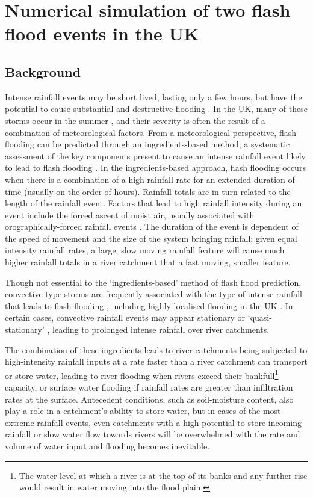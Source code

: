 \chapter{Numerical simulation of two flash flood events in the UK}
\label{chapter_events}

\section{Background}
Intense rainfall events may be short lived, lasting only a few hours, but have the potential to cause substantial and destructive flooding \citep{lane2008climate,pitt2008pitt}. In the UK, many of these storms occur in the summer \citep{Kendon2014}, and their severity is often the result of a combination of meteorological factors. From a meteorological perspective, flash flooding can be predicted through an ingredients-based method; a systematic assessment of the key components present to cause an intense rainfall event likely to lead to flash flooding \citep{Doswell1996}. In the ingredients-based approach, flash flooding occurs when there is a combination of a high rainfall rate for an extended duration of time (usually on the order of hours). Rainfall totals are in turn related to the length of the rainfall event. Factors that lead to high rainfall intensity during an event include the forced ascent of moist air, usually associated with orographically-forced rainfall events \citep{Barros1994,Houze2012}. The duration of the event is dependent of the speed of movement and the size of the system bringing rainfall; given equal intensity rainfall rates, a large, slow moving rainfall feature will cause much higher rainfall totals in a river catchment that a fast moving, smaller feature. 

Though not essential to the `ingredients-based' method of flash flood prediction, convective-type storms are frequently associated with the type of intense rainfall that leads to flash flooding \citep{doswell1993flash}, including highly-localised flooding in the UK \citep{gray1998mesoscale,Browning2007}. In certain cases, convective rainfall events may appear stationary or `quasi-stationary' \citep{chappell1986quasi,warren2014boscastle}, leading to prolonged intense rainfall over river catchments.

The combination of these ingredients leads to river catchments being subjected to high-intensity rainfall inputs at a rate faster than a river catchment can transport or store water, leading to river flooding when rivers exceed their bankfull\footnote{The water level at which a river is at the top of its banks and any further rise would result in water moving into the flood plain.} capacity, or surface water flooding if rainfall rates are greater than infiltration rates at the surface. Antecedent conditions, such as soil-moisture content, also play a role in a catchment's ability to store water, but in cases of the most extreme rainfall events, even catchments with a high potential to store incoming rainfall or slow water flow towards rivers will be overwhelmed with the rate and volume of water input and flooding becomes inevitable.

